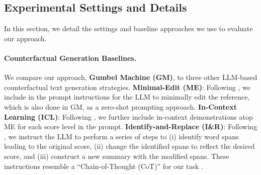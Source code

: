 \documentclass[letterpaper]{article} %
\newcommand{\mh}[1]{\textcolor{teal}{\bf [Hunter: #1]}}
\begin{document}


\subsection{Experimental Settings and Details}

In this section, we detail the settings and baseline approaches we use to evaluate our approach.

\paragraph{Counterfactual Generation Baselines.}

We compare our approach, \textbf{Gumbel Machine (GM)}, to three other LLM-based counterfactual text generation strategies.
%
\textbf{Minimal-Edit (ME)}: Following \citet{gat_faithful_2023}, we include in the prompt instructions for the LLM to minimally edit the reference, which is also done in GM, as a zero-shot prompting approach.
\textbf{In-Context Learning (ICL)}: Following \citet{li_prompting_2024}, we further include in-context demonstrations atop ME for each score level in the prompt.
\textbf{Identify-and-Replace (I\&R)}: Following \citet{nguyen_llms_2024}, we instruct the LLM to perform a series of steps to (i) identify word spans leading to the original score, (ii) change the identified spans to reflect the desired score, and (iii) construct a new summary with the modified spans. These instructions resemble a ``Chain-of-Thought (CoT)'' for our task \cite{wei2022chain}.
\end{document}
